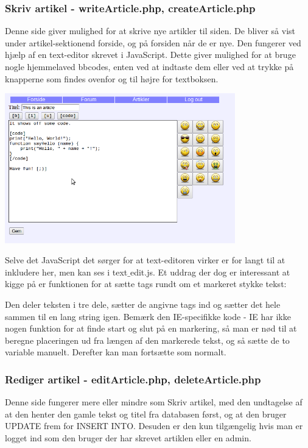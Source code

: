 \documentclass{article}
\begin{document}
\subsubsection[Skriv artikel]{Skriv artikel - writeArticle.php, createArticle.php}
Denne side giver mulighed for at skrive nye artikler til siden. De bliver så vist under artikel-sektionend forside, og på forsiden når de er nye. Den fungerer ved hjælp af en text-editor skrevet i JavaScript. Dette giver mulighed for at bruge nogle hjemmelaved bbcodes, enten ved at indtaste dem eller ved at trykke på knapperne som findes ovenfor og til højre for textboksen.

\includegraphics[width=100mm]{mi04.png}

Selve det JavaScript det sørger for at text-editoren virker er for langt til at inkludere her, men kan ses i text$\_$edit.js. Et uddrag der dog er interessant at kigge på er funktionen for at sætte tags rundt om et markeret stykke tekst:



Den deler teksten i tre dele, sætter de angivne tags ind og sætter det hele sammen til en lang string igen. Bemærk den IE-specifikke kode - IE har ikke nogen funktion for at finde start og slut på en markering, så man er nød til at beregne placeringen ud fra længen af den markerede tekst, og så sætte de to variable manuelt. Derefter kan man fortsætte som normalt.

\subsubsection[Rediger artikel]{Rediger artikel - editArticle.php, deleteArticle.php}
Denne side fungerer mere eller mindre som Skriv artikel, med den undtagelse af at den henter den gamle tekst og titel fra databasen først, og at den bruger UPDATE frem for INSERT INTO. Desuden er den kun tilgængelig hvis man er logget ind som den bruger der har skrevet artiklen eller en admin.
\end{document}
